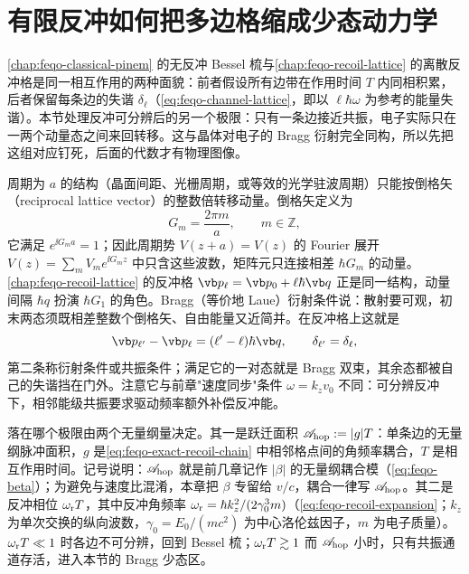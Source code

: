 \section{有限反冲如何把多边格缩成少态动力学}
\label{chap:feqo-bragg}

\cref{chap:feqo-classical-pinem} 的无反冲 Bessel 梳与\cref{chap:feqo-recoil-lattice} 的离散反冲格是同一相互作用的两种面貌：前者假设所有边带在作用时间 \(T\) 内同相积累，后者保留每条边的失谐 \(\delta_\ell\)（\cref{eq:feqo-channel-lattice}，即以 \(\ell\hbar\omega\) 为参考的能量失谐）。本节处理反冲可分辨后的另一个极限：只有一条边接近共振，电子实际只在一两个动量态之间来回转移。这与晶体对电子的 Bragg 衍射完全同构，所以先把这组对应钉死，后面的代数才有物理图像。

周期为 \(a\) 的结构（晶面间距、光栅周期，或等效的光学驻波周期）只能按倒格矢（reciprocal lattice vector）的整数倍转移动量。倒格矢定义为
\begin{equation}
G_m=\frac{2\pi m}{a},\qquad m\in\mathbb Z,
\label{eq:feqo-reciprocal-lattice}
\end{equation}
它满足 \(e^{\ii G_m a}=1\)；因此周期势 \(V(z+a)=V(z)\) 的 Fourier 展开 \(V(z)=\sum_mV_me^{\ii G_mz}\) 中只含这些波数，矩阵元只连接相差 \(\hbar G_m\) 的动量。\cref{chap:feqo-recoil-lattice} 的反冲格 \(\vb p_\ell=\vb p_0+\ell\hbar\vb q\) 正是同一结构，动量间隔 \(\hbar q\) 扮演 \(\hbar G_1\) 的角色。Bragg（等价地 Laue）衍射条件说：散射要可观，初末两态须既相差整数个倒格矢、自由能量又近简并。在反冲格上这就是
\begin{equation}
\vb p_{\ell'}-\vb p_\ell=(\ell'-\ell)\hbar\vb q,\qquad
\delta_{\ell'}=\delta_\ell ,
\label{eq:feqo-bragg-laue-condition}
\end{equation}
第二条称衍射条件或共振条件；满足它的一对态就是 Bragg 双束，其余态都被自己的失谐挡在门外。注意它与前章"速度同步"条件 \(\omega=k_zv_0\) 不同：可分辨反冲下，相邻能级共振要求驱动频率额外补偿反冲能。

落在哪个极限由两个无量纲量决定。其一是跃迁面积 \(\mathscr A_{\rm hop}:=|g|T\)：单条边的无量纲脉冲面积，\(g\) 是\cref{eq:feqo-exact-recoil-chain} 中相邻格点间的角频率耦合，\(T\) 是相互作用时间。记号说明：\(\mathscr A_{\rm hop}\) 就是前几章记作 \(|\beta|\) 的无量纲耦合模（\cref{eq:feqo-beta}）；为避免与速度比混淆，本章把 \(\beta\) 专留给 \(v/c\)，耦合一律写 \(\mathscr A_{\rm hop}\)。其二是反冲相位 \(\omega_{\rm r}T\)，其中反冲角频率 \(\omega_{\rm r}=\hbar k_z^2/(2\gamma_0^3m)\)（\cref{eq:feqo-recoil-expansion}；\(k_z\) 为单次交换的纵向波数，\(\gamma_0=E_0/(mc^2)\) 为中心洛伦兹因子，\(m\) 为电子质量）。\(\omega_{\rm r}T\ll1\) 时各边不可分辨，回到 Bessel 梳；\(\omega_{\rm r}T\gtrsim1\) 而 \(\mathscr A_{\rm hop}\) 小时，只有共振通道存活，进入本节的 Bragg 少态区。

